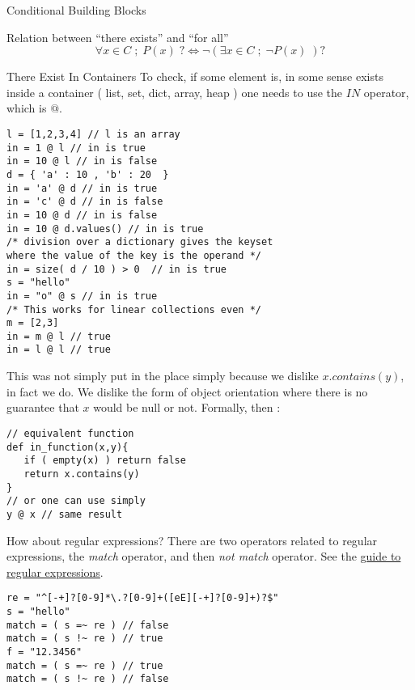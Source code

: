 \begin{section}{Conditional Building Blocks}
\begin{subsection}{Relation between ``there exists'' and ``for all'' }
$$
\forall x \in C \; ; \; P(x) \; ? \Longleftrightarrow \neg ( \exists x \in C \; ; \; \neg P(x) \; ) ?
$$
\end{subsection}

\begin{subsection}{There Exist In Containers}
To check, if some element is, in some sense exists inside a container ( list, set, dict, array, heap )
one needs to use the $IN$ operator, which is $@$. 
\begin{center}\begin{minipage}{\linewidth}
\begin{lstlisting}[style=JexlStyle]
l = [1,2,3,4] // l is an array 
in = 1 @ l // in is true 
in = 10 @ l // in is false 
d = { 'a' : 10 , 'b' : 20  }
in = 'a' @ d // in is true 
in = 'c' @ d // in is false 
in = 10 @ d // in is false 
in = 10 @ d.values() // in is true 
/* division over a dictionary gives the keyset 
where the value of the key is the operand */
in = size( d / 10 ) > 0  // in is true 
s = "hello"
in = "o" @ s // in is true 
/* This works for linear collections even */
m = [2,3]
in = m @ l // true 
in = l @ l // true  
\end{lstlisting}
\end{minipage}\end{center}

This was not simply put in the place simply because we dislike $x.contains(y)$, in fact we do.
We dislike the form of object orientation where there is no guarantee that $x$ would be null or not.
Formally, then :

\begin{lstlisting}[style=JexlStyle]
// equivalent function 
def in_function(x,y){
   if ( empty(x) ) return false 
   return x.contains(y) 
}
// or one can use simply 
y @ x // same result
\end{lstlisting}

How about regular expressions? There are two operators related to regular expressions,
the \emph{match} operator, and then \emph{not match} operator. 
See the \href{http://www.regular-expressions.info/quickstart.html}{guide to regular expressions}.

\begin{center}\begin{minipage}{\linewidth}
\begin{lstlisting}[style=JexlStyle]
re = "^[-+]?[0-9]*\.?[0-9]+([eE][-+]?[0-9]+)?$"
s = "hello"
match = ( s =~ re ) // false 
match = ( s !~ re ) // true 
f = "12.3456"
match = ( s =~ re ) // true 
match = ( s !~ re ) // false 
\end{lstlisting}
\end{minipage}\end{center}


\end{subsection}
\end{section}
